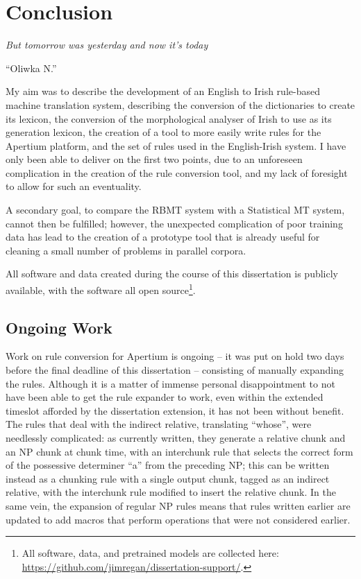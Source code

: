 
\chapter{Conclusion}
\label{chap:conclusion}
\epigraph{\textit{\small{But tomorrow was yesterday and now it's today}}}{``Oliwka N.''}

My aim was to describe the development of an English to Irish rule-based machine translation
system, describing the conversion of the dictionaries to create its lexicon, the conversion
of the morphological analyser of Irish to use as its generation lexicon, the creation of a tool
to more easily write rules for the Apertium platform, and the set of rules used in the English-Irish 
system. I have only been able to deliver on the first two points, due to an unforeseen complication
in the creation of the rule conversion tool, and my lack of foresight to allow for such an
eventuality.

A secondary goal, to compare the RBMT system with a Statistical MT system, cannot then be fulfilled;
however, the unexpected complication of poor training data has lead to the creation of a
prototype tool that is already useful for cleaning a small number of problems in parallel corpora.

All software and data created during the course of this dissertation is publicly available, with
the software all open source\footnote{All software, data, and pretrained models are collected
here: \href{https://github.com/jimregan/dissertation-support/}{https://github.com/jimregan/dissertation-support/}.}.

\section{Ongoing Work}

Work on rule conversion for Apertium is ongoing -- it was put on hold two days before the final 
deadline of this dissertation -- consisting of manually expanding the rules. Although it is a matter of
immense personal disappointment to not have been able to get the rule expander to work, even within
the extended timeslot afforded by the dissertation extension, it has not been without benefit. The
rules that deal with the indirect relative, translating ``whose'', were needlessly complicated: as
currently written, they generate a relative chunk and an NP chunk at chunk time, with an interchunk
rule that selects the correct form of the possessive determiner ``a'' from the preceding NP; this
can be written instead as a chunking rule with a single output chunk, tagged as an indirect 
relative, with the interchunk rule modified to insert the relative chunk. In the same vein, 
the expansion of regular NP rules means that rules written earlier are updated to
add macros that perform operations that were not considered earlier.


